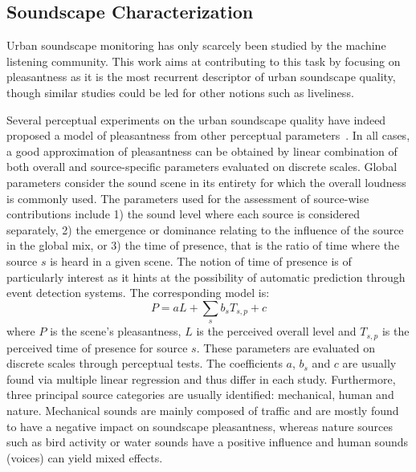 \documentclass{article}
\begin{document}
\begin{sloppy}
\section{Soundscape Characterization}
\label{sec:char}

Urban soundscape monitoring has only scarcely been studied by the machine listening community\cite{bello2018}. This work aims at contributing to this task by focusing on pleasantness as it is the most recurrent descriptor of urban soundscape quality, though similar studies could be led for other notions such as liveliness.

Several perceptual experiments on the urban soundscape quality have indeed proposed a model of pleasantness from other perceptual parameters~\cite{nilsson2007, axelsson2010, aumond2017, ricciardi2014}. In all cases, a good approximation of pleasantness can be obtained by linear combination of both overall and source-specific parameters evaluated on discrete scales. Global parameters consider the sound scene in its entirety for which the overall loudness is commonly used. The parameters used for the assessment of source-wise contributions include 1) the sound level where each source is considered separately, 2) the emergence or dominance relating to the influence of the source in the global mix, or 3) the time of presence, that is the ratio of time where the source $s$ is heard in a given scene. The notion of time of presence is of particularly interest as it hints at the possibility of automatic prediction through event detection systems. The corresponding model is:
\begin{equation}
P = aL + \sum_s b_sT_{s,p} + c
\end{equation}
where $P$ is the scene's pleasantness, $L$ is the perceived overall level and $T_{s,p}$ is the perceived time of presence for source $s$. These parameters are evaluated on discrete scales through perceptual tests. The coefficients $a$, $b_s$ and $c$ are usually found via multiple linear regression and thus differ in each study.
Furthermore, three principal source categories are usually identified: mechanical, human and nature. Mechanical sounds are mainly composed of traffic and are mostly found to have a negative impact on soundscape pleasantness, whereas nature sources such as bird activity or water sounds have a positive influence and human sounds (voices) can yield mixed effects.



\end{sloppy}
\end{document}
